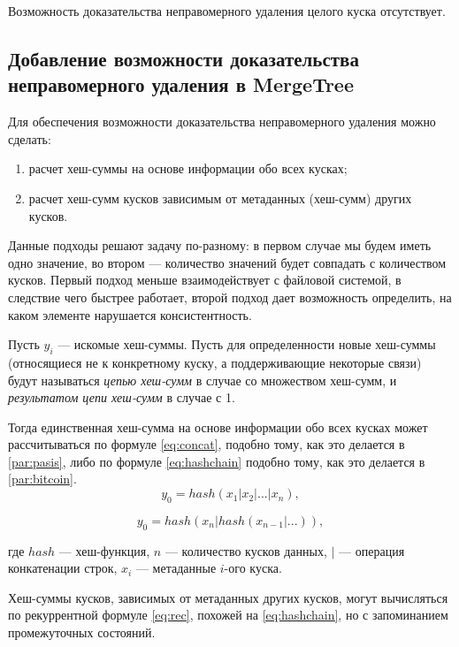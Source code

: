 Возможность доказательства неправомерного удаления целого куска отсутствует.

\subsection{Добавление возможности доказательства неправомерного удаления в MergeTree}

Для обеспечения возможности доказательства неправомерного удаления можно сделать:
\begin{enumerate}
	\item расчет хеш-суммы на основе информации обо всех кусках;
	\item расчет хеш-сумм кусков зависимым от метаданных (хеш-сумм) других кусков.
\end{enumerate}

Данные подходы решают задачу по-разному: в первом случае мы будем иметь одно значение, во втором --- количество значений будет совпадать с количеством кусков. Первый подход меньше взаимодействует с файловой системой, в следствие чего быстрее работает, второй подход дает возможность определить, на каком элементе нарушается консистентность.

Пусть $y_i$ --- искомые хеш-суммы. Пусть для определенности новые хеш-суммы (относящиеся не к конкретному куску, а поддерживающие некоторые связи) будут называться \textit{цепью хеш-сумм} в случае со множеством хеш-сумм, и \textit{результатом цепи хеш-сумм} в случае с 1.

Тогда единственная хеш-сумма на основе информации обо всех кусках может рассчитываться по формуле \ref{eq:concat}, подобно тому, как это делается в \ref{par:pasis}, либо по формуле \ref{eq:hashchain} подобно тому, как это делается в \ref{par:bitcoin}.
\begin{equation}
\label{eq:concat}
y_0 = hash(x_1 | x_2 | ... | x_n),
\end{equation}

\begin{equation}
\label{eq:hashchain}
y_0 = hash(x_n | hash(x_{n-1} | ...)),
\end{equation}

где $hash$ --- хеш-функция, $n$ --- количество кусков данных, $|$ --- операция конкатенации строк, $x_i$ --- метаданные $i$-ого куска.

Хеш-суммы кусков, зависимых от метаданных других кусков, могут вычисляться по рекуррентной формуле \ref{eq:rec}, похожей на \ref{eq:hashchain}, но с запоминанием промежуточных состояний.

